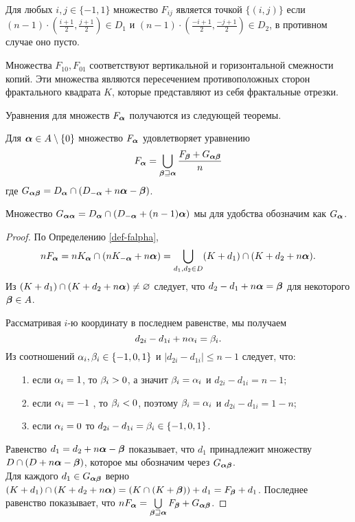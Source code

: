 Для любых $i,j\in\{-1,1\}$ множество $F_{ij}$ является точкой $\{(i,j)\}$ если $(n-1)\cdot\left(\frac{i+1}{2},\frac{j+1}{2}\right)\in D_1$ и $(n-1)\cdot\left(\frac{-i+1}{2},\frac{-j+1}{2}\right)\in D_2$, в противном случае оно пусто. 

Множества $F_{10}, F_{01}$ соответствуют вертикальной и горизонтальной смежности копий. 
Эти множества являются пересечением противоположных сторон фрактального квадрата $K$, которые представляют из себя фрактальные отрезки.

Уравнения для множеств $F_{\bm{\alpha}}$ получаются из следующей теоремы.

\begin{theorem}\label{thm:falpha}
Для ${\bm{\alpha}}\in A\setminus\{0\}$ множество $F_{\bm{\alpha}}$ удовлетворяет уравнению
\begin{equation}\label{sideint}
 F_{\bm{\alpha}}=\bigcup\limits_{{\bm{\beta}}\sqsupseteq{\bm{\alpha}}} \dfrac{F_{\bm{\beta}}+G_{{\bm{\alpha}}{\bm{\beta}}}}{n}
 \end{equation}
где 
$G_{{\bm{\alpha}}{\bm{\beta}}}=D_{\bm{\alpha}}\cap(D_{-{\bm{\alpha}}}+n{\bm{\alpha}}-{\bm{\beta}})$.
\end{theorem}

Множество $G_{{\bm{\alpha}}{\bm{\alpha}}}=D_{\bm{\alpha}}\cap(D_{-{\bm{\alpha}}}+(n-1){\bm{\alpha}})$ мы для удобства обозначим как $G_{{\bm{\alpha}}}$.

\begin{proof}
По Определению \ref{def-falpha},
\begin{equation}\label{line}
 nF_{\bm{\alpha}}=nK_{\bm{\alpha}} \cap (nK_{-{\bm{\alpha}}}+n{\bm{\alpha}})= 
 \bigcup\limits_{d_1,d_2\in D}(K+d_1)\cap (K+d_2+n{\bm{\alpha}}).
 \end{equation}
Из $(K+d_1)\cap (K+d_2+n{\bm{\alpha}})\neq\varnothing$ следует, что $d_2-d_1+n{\bm{\alpha}}={\bm{\beta}}$ для некоторого ${\bm{\beta}}\in A$.

Рассматривая $i$-ю координату в последнем равенстве, мы получаем
$$d_{2i}-d_{1i}+n\alpha_i=\beta_i.$$ 
Из соотношений $\alpha_i,\beta_i\in\{-1,0,1\}$ и $|d_{2i}-d_{1i}|\le n-1$ следует, что:\\ 
\begin{itemize}[nolistsep]
 \item[1.] если $\alpha_i=1$, то $\beta_i>0$, а значит $\beta_i=\alpha_i$ и $d_{2i}-d_{1i}=n-1$;
 \item[2.] если $\alpha_i=-1$ , то $\beta_i<0$, поэтому $\beta_i=\alpha_i$ и $d_{2i}-d_{1i}=1-n$;
 \item[3.] если $\alpha_i=0$ то $d_{2i}-d_{1i}=\beta_i\in\{-1,0,1\}$.
\end{itemize}

Равенство $d_1=d_2+n{\bm{\alpha}}-{\bm{\beta}}$ показывает, что $d_1$ принадлежит множеству $D\cap(D+n{\bm{\alpha}}-{\bm{\beta}})$, которое мы обозначим через $G_{{\bm{\alpha}}{\bm{\beta}}}$.\\
Для каждого $d_1\in G_{{\bm{\alpha}}{\bm{\beta}}}$ верно $(K+d_1)\cap (K+d_2+n{\bm{\alpha}})= (K\cap(K+{\bm{\beta}}))+d_1= F_{\bm{\beta}}+d_1$.
Последнее равенство показывает, что $nF_{\bm{\alpha}}= \bigcup\limits_{{\bm{\beta}}\sqsupseteq{\bm{\alpha}}} {F_{\bm{\beta}}+G_{{\bm{\alpha}}{\bm{\beta}}}}$.
\end{proof}


